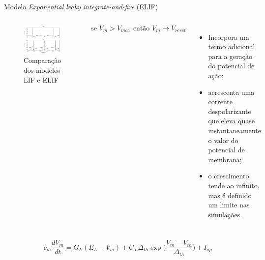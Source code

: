 \begin{frame}{Modelo \textit{Exponential leaky integrate-and-fire} (ELIF)}
	\begin{columns}[t]
		\column{5cm}
			\begin{figure}[tb]
				\centering
				\caption{Comparação dos modelos LIF e ELIF}
				\label{fig:elif}
				\includegraphics[width=0.8\linewidth]{figs/elif}
			\end{figure}
			\[
				\text{se } V_m > V_{max} \text{ então } V_m\mapsto V_{reset}
			\]
		\column{5cm}
		\begin{itemize}
			\item Incorpora um termo adicional para a geração do potencial de ação;
			\item acrescenta uma corrente despolarizante que eleva quase instantaneamente o valor do potencial de membrana;
			\item o crescimento tende ao infinito, mas é definido um limite nas simulações.
		\end{itemize}
	\end{columns}
	\vfill
	\[
	c_m\frac{dV_m}{dt} = G_L(E_L-V_m) + G_L\Delta_{th}\exp\Big(\frac{V_m-V_{th}}{\Delta_{th}}\Big) + I_{ap}
	\]
\end{frame}

